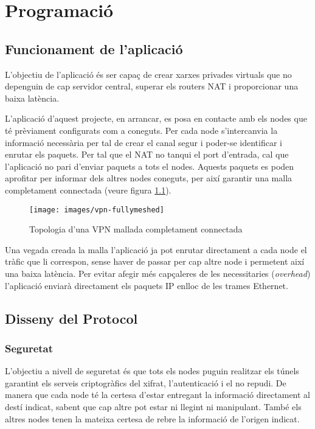 \chapter{Programació}
\section{Funcionament de l'aplicació}
L'objectiu de l'aplicació és ser capaç de crear xarxes privades virtuals que no depenguin de cap servidor central, superar els routers NAT i proporcionar una baixa latència.

L'aplicació d'aquest projecte, en arrancar, es posa en contacte amb els nodes que té prèviament configurats com a coneguts. Per cada node s'intercanvia la informació necessària per tal de crear el canal segur i poder-se identificar i enrutar els paquets. Per tal que el NAT no tanqui el port d'entrada, cal que l'aplicació no pari d'enviar paquets a tots el nodes. Aquests paquets es poden aprofitar per informar dels altres nodes coneguts, per així garantir una malla completament connectada (veure figura \ref{F:vpn-fullymeshed}).
\begin{figure}[htb]
\centering
\texttt{[image: images/vpn-fullymeshed]}
\caption{Topologia d'una VPN mallada completament connectada}
\label{F:vpn-fullymeshed}
\end{figure}
Una vegada creada la malla l'aplicació ja pot enrutar directament a cada node el tràfic que li correspon, sense haver de passar per cap altre node i permetent així una baixa latència. Per evitar afegir més capçaleres de les necessitaries (\emph{overhead}) l'aplicació enviarà directament els paquets IP enlloc de les trames Ethernet.

\section{Disseny del Protocol}
\subsection{Seguretat}
L'objectiu a nivell de seguretat és que tots els nodes puguin realitzar els túnels garantint els serveis criptogràfics del xifrat, l'autenticació i el no repudi. De manera que cada node té la certesa d'estar entregant la informació directament al destí indicat, sabent que cap altre pot estar ni llegint ni manipulant. També els altres nodes tenen la mateixa certesa de rebre la informació de l'origen indicat.

